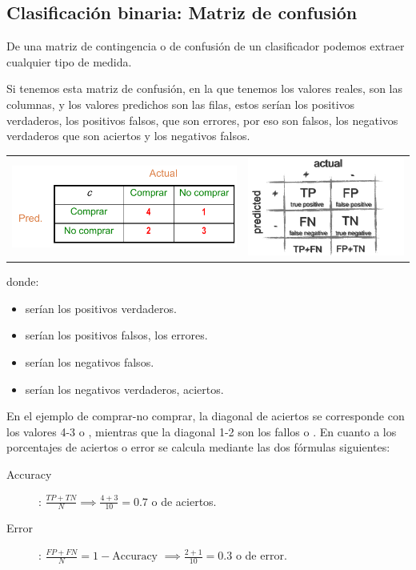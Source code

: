 \subsection{Clasificación binaria: Matriz de confusión}

De una matriz de contingencia o de confusión de un clasificador podemos extraer cualquier tipo de medida.

Si tenemos esta matriz de confusión, en la que tenemos los valores reales, son las columnas, y los valores predichos son las filas, estos serían los positivos verdaderos, los positivos falsos, que son errores, por eso son falsos, los negativos verdaderos que son aciertos y los negativos falsos.
\begin{center}
    \begin{tabular}{ c c }
        \includegraphics[scale=.67]{images/mod02-12_1.png}    &
        \includegraphics[scale=.67]{images/mod02-12_2.png}    
    \end{tabular}
\end{center}
donde:
\begin{itemize}
    \item {} serían los positivos verdaderos.
    \item {} serían los positivos falsos, los errores.
    \item {} serían los negativos falsos.
    \item {} serían los negativos verdaderos, aciertos.
\end{itemize}
En el ejemplo de comprar-no comprar, la diagonal de aciertos se corresponde con los valores 4-3 o , mientras que la diagonal 1-2 son los fallos o . En cuanto a los porcentajes de aciertos o error se calcula mediante las dos fórmulas siguientes:
\begin{description}
    \item[Accuracy] : $\frac{TP + TN}{N}\implies \frac{4+3}{10} = 0.7$ o  de aciertos.
    \item[Error]: $\frac{FP+FN}{N} = 1 - \text{Accuracy }\implies\frac{2+1}{10} = 0.3$ o  de error.
\end{description}

